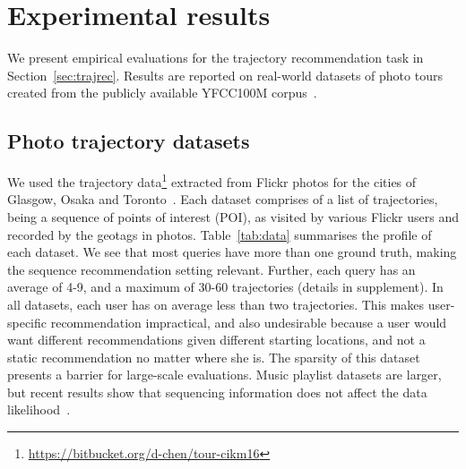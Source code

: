 
\section{Experimental results}
\label{sec:experiment}



We present empirical evaluations for the trajectory recommendation task in
Section~\ref{sec:trajrec}.
Results are reported on real-world datasets of photo tours
created from the publicly available YFCC100M corpus~\cite{thomee2016yfcc100m}.


\subsection{Photo trajectory datasets}
\label{sec:dataset}

We used the trajectory data\footnote{\url{https://bitbucket.org/d-chen/tour-cikm16}}
extracted from Flickr photos for the cities of Glasgow, Osaka and
Toronto~\cite{ijcai15,cikm16paper}.
Each dataset comprises of a
list of trajectories, being a sequence of points of interest (POI),
as visited by various Flickr users and recorded by the geotags in photos.
Table~\ref{tab:data} summarises the profile of each dataset.
We see that most queries have more than one ground truth, making the sequence recommendation setting relevant. Further, each query has an average of 4-9, and a maximum of 30-60 trajectories (details in supplement).
In all datasets,
each user has on average less than two trajectories.
This makes user-specific recommendation impractical, and also undesirable because
a user would want different recommendations given different starting locations, and not a static recommendation no matter where she is.
The sparsity of this dataset presents a barrier for large-scale evaluations.
Music playlist datasets are larger, but recent results show that sequencing information does not affect the data likelihood~\cite{chen2012playlist}.

